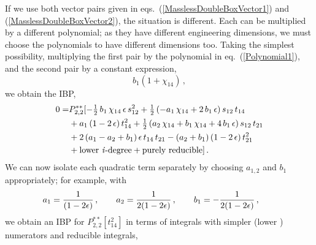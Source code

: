 \documentclass[aps,prd,preprint,groupedaddress,nofootinbib,showpacs,eqsecnum]{revtex4}
\def\eqn#1{eq.~(\ref{#1})}
\def\eqns#1#2{eqs.~(\ref{#1}) and (\ref{#2})}
\def\eps{\epsilon}
\def\Pss#1#2{P^{**}_{#1,#2}}
\begin{document}
If we use both vector pairs given 
in \eqns{MasslessDoubleBoxVector1}{MasslessDoubleBoxVector2},
the situation is different.  Each can be multiplied by a different polynomial;
as they have different engineering dimensions, we must choose the 
polynomials to have different dimensions too.  
Taking the simplest possibility, multiplying
the first pair by the polynomial in \eqn{Polynomial1}, and the second
pair by a constant expression, 
\begin{equation}
b_1 (1+\chi_{14})\,,
\label{Polynomial2}
\end{equation}
we obtain the IBP,
\begin{equation}
\begin{aligned}
0 = &\Pss22[
-\tfrac{1}{2}\,b_{1}\,\chi_{14}\,\eps\,s_{12}^{2}
+\tfrac{1}{2}\,(-a_{1}\,\chi_{14}+2\,b_{1}\,\eps)\,s_{12}\,t_{14}
\\ &
+a_{1}\,(1-2\,\eps)\,t_{14}^{2}
+\tfrac{1}{2}\,(a_{2}\,\chi_{14}+b_{1}\,\chi_{14}+4\,b_{1}\,\eps)\,s_{12}\,t_{21}
\\ &
+2\,(a_{1}-a_{2}+b_{1})\,\eps\,t_{14}\,t_{21}
-(a_{2}+b_{1})\,(1-2\,\eps)\,t_{21}^{2}
\\
&+\textrm{lower\ \ideg{}}+\textrm{purely\ reducible}]\,.
\end{aligned}
\label{FlexibleIBP}
\end{equation}
We can now isolate each quadratic term separately by choosing $a_{1,2}$ 
and $b_1$ appropriately; for example, with 
\begin{equation}
a_1 = 
  \frac{1}{(1-2\e)}
  \,,\qquad
a_2 = 
  \frac{1}{2(1-2\e)}
  \,,\qquad
b_1 = 
  -\frac{1}{2(1-2\e)}
  \,,\qquad
\label{QuadraticSolution1}
\end{equation}
we obtain an IBP for $\Pss22[t_{14}^2]$ in terms of integrals
with simpler (lower \ideg{}) numerators and reducible integrals,
\end{document}
